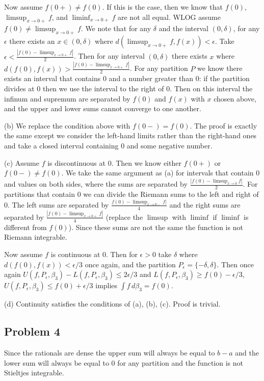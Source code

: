 \documentclass{amsart}
\begin{document}
\medskip \noindent Now assume $f(0+)\neq f(0)$. If this is the case, then we know that $f(0)$,
$\limsup_{x\to 0+} f$, and $\liminf_{x\to0+}f$ are not all equal. WLOG assume $f(0)\neq\limsup_{x\to0+}f$. We note that for any $\delta$ and the interval $(0, \delta)$, for any $\epsilon$ there exists an $x\in(0, \delta)$ where $d(\limsup_{x\to0+}f, f(x))<\epsilon$. Take $\epsilon< \frac{|f(0)-\limsup_{x\to0+}f|}{2}$. Then for any interval $(0,\delta)$ there exists $x$ where $d(f(0), f(x))>\frac{|f(0)-\limsup_{x\to0+}f|}{2}$. For any partition $P$ we know there exists an interval that contains $0$ and a number greater than $0$: if the partition divides at 0 then we use the interval to the right of $0$. Then on this interval the infinum and supremum are separated by $f(0)$ and $f(x)$ with $x$ chosen above, and the upper and lower sums cannot converge to one another.

\bigskip \noindent (b) We replace the condition above with $f(0-)=f(0)$. The proof is exactly the same except we consider the left-hand limits rather than the right-hand ones and take a closed interval containing $0$ and some negative number.

\bigskip \noindent (c) Assume $f$ is discontinuous at $0$. Then we know either $f(0+)$ or $f(0-)\neq f(0)$. We take the same argument as (a) for intervals that contain $0$ and values on both sides, where the sums are separated by $\frac{|f(0)-\limsup_{x\to0}f|}{2}$. For partitions that contain $0$ we can divide the Riemann sums to the left and right of $0$. The left sums are separated by $\frac{f(0)-\limsup_{x\to0-}f|}{4}$ and the right sums are separated by $\frac{|f(0)-\limsup_{x\to0+}f|}{4}$ (replace the $\limsup$ with $\liminf$ if $\liminf$ is different from $f(0)$). Since these sums are not the same the function is not Riemann integrable.

\medskip \noindent Now assume $f$ is continuous at $0$. Then for $\epsilon>0$ take $\delta$ where $d(f(0), f(x))<\epsilon/3$ once again, and the partition $P_{\epsilon}=\{-\delta, \delta\}$. Then once again $U(f,P_{\epsilon},\beta_3)-L(f,P_{\epsilon},\beta_3)\leq 2\epsilon/3$ and $L(f,P_\epsilon,\beta_3)\geq f(0)-\epsilon/3$, $U(f,P_\epsilon,\beta_3)\leq f(0)+\epsilon/3$ implies $\int f\,d\beta_3=f(0)$.

\bigskip \noindent (d) Continuity satisfies the conditions of (a), (b), (c). Proof is trivial.

\subsection*{Problem 4}
Since the rationals are dense the upper sum will always be equal to $b-a$ and the lower sum will always be equal to $0$ for any partition and the function is not Stieltjes integrable.
\end{document}
